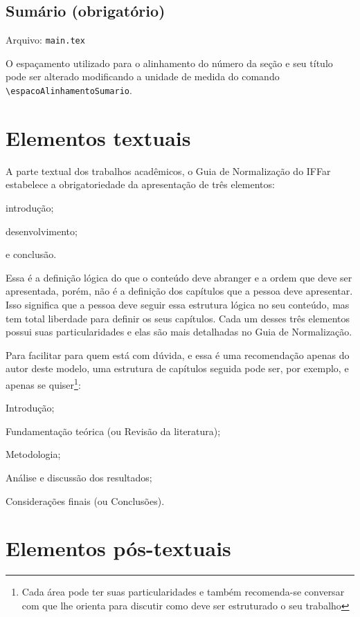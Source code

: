\subsection{Sumário (obrigatório)}
    Arquivo: \texttt{main.tex}

    O espaçamento utilizado para o alinhamento do número da seção e seu título pode ser alterado modificando a unidade de medida do comando \verb|\espacoAlinhamentoSumario|.
    

\section{Elementos textuais}
    A parte textual dos trabalhos acadêmicos, o Guia de Normalização do IFFar estabelece a obrigatoriedade da apresentação de três elementos:
        \begin{alinea}
            \item introdução;
            \item desenvolvimento;
            \item e conclusão.
        \end{alinea}
    Essa é a definição lógica do que o conteúdo deve abranger e a ordem que deve ser apresentada, porém, não é a definição dos capítulos que a pessoa deve apresentar. Isso significa que a pessoa deve seguir essa estrutura lógica no seu conteúdo, mas tem total liberdade para definir os seus capítulos. Cada um desses três elementos possui suas particularidades e elas são mais detalhadas no Guia de Normalização.

    Para facilitar para quem está com dúvida, e essa é uma recomendação apenas do autor deste modelo, uma estrutura de capítulos seguida pode ser, por exemplo, e apenas se quiser\footnote{Cada área pode ter suas particularidades e também recomenda-se conversar com que lhe orienta para discutir como deve ser estruturado o seu trabalho}: 
        \begin{alinea}
            \item Introdução;
            \item Fundamentação teórica (ou Revisão da literatura);
            \item Metodologia;
            \item Análise e discussão dos resultados;
            \item Considerações finais (ou Conclusões).
        \end{alinea}

\section{Elementos pós-textuais}

